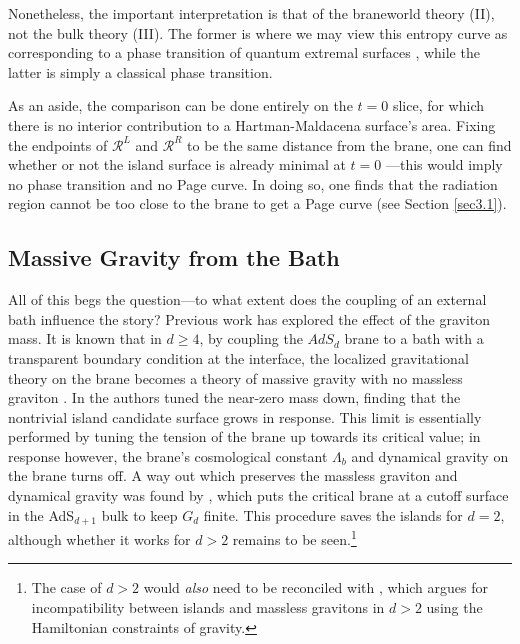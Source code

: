 \documentclass[12pt,a4paper]{article}
\begin{document}
Nonetheless, the important interpretation is that of the braneworld theory (II), not the bulk theory (III). The former is where we may view this entropy curve as corresponding to a phase transition of quantum extremal surfaces \cite{Engelhardt:2014gca}, while the latter is simply a classical phase transition.

As an aside, the comparison can be done entirely on the $t = 0$ slice, for which there is no interior contribution to a Hartman-Maldacena surface's area. Fixing the endpoints of $\mathcal{R}^L$ and $\mathcal{R}^R$ to be the same distance from the brane, one can find whether or not the island surface is already minimal at $t = 0$ \cite{Geng:2020qvw}---this would imply no phase transition and no Page curve. In doing so, one finds that the radiation region cannot be too close to the brane to get a Page curve (see Section \ref{sec3.1}).

\subsection{Massive Gravity from the Bath}

All of this begs the question---to what extent does the coupling of an external bath influence the story? Previous work has explored the effect of the graviton mass. It is known that in $d \geq 4$, by coupling the $AdS_d$ brane to a bath with a transparent boundary condition at the interface, the localized gravitational theory on the brane becomes a theory of massive gravity with no massless graviton \cite{Aharony:2003qf,Aharony:2006hz}. In \cite{Geng:2020qvw} the authors tuned the near-zero mass down, finding that the nontrivial island candidate surface grows in response. This limit is essentially performed by tuning the tension of the brane up towards its critical value; in response however, the brane's cosmological constant $\Lambda_b$ and dynamical gravity on the brane turns off. A way out which preserves the massless graviton and dynamical gravity was found by \cite{Krishnan:2020fer}, which puts the critical brane at a cutoff surface in the AdS$_{d+1}$ bulk to keep $G_d$ finite. This procedure saves the islands for $d = 2$, although whether it works for $d > 2$ remains to be seen.\footnote{The case of $d > 2$ would \textit{also} need to be reconciled with \cite{Geng:2021gau}, which argues for incompatibility between islands and massless gravitons in $d > 2$ using the Hamiltonian constraints of gravity.}
\end{document}
